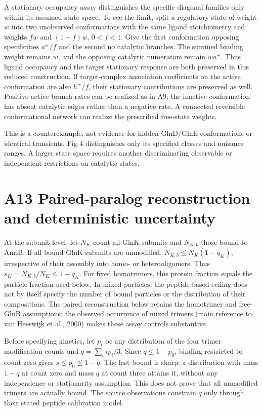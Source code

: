 \documentclass[11pt]{article}
\begin{document}
A stationary occupancy assay distinguishes the specific diagonal families only within its assumed state space. To see the limit, split a regulatory state of weight $w$ into two unobserved conformations with the same ligand stoichiometry and weights $fw$ and $(1-f)w$, $0<f<1$. Give the first conformation opposing specificities $a^{\pm}/f$ and the second no catalytic branches. The summed binding weight remains $w$, and the opposing catalytic numerators remain $wa^{\pm}$. Thus ligand occupancy and the target stationary response are both preserved in this reduced construction. If target-complex association coefficients on the active conformation are also $h^{\pm}/f$, their stationary contributions are preserved as well. Positive active-branch rates can be realized as in A9; the inactive conformation has absent catalytic edges rather than a negative rate. A connected reversible conformational network can realize the prescribed free-state weights.

This is a counterexample, not evidence for hidden GlnD/GlnE conformations or identical transients. Fig 4 distinguishes only its specified classes and nuisance ranges. A larger state space requires another discriminating observable or independent restrictions on catalytic states.


\section*{A13 Paired-paralog reconstruction and deterministic uncertainty}

At the subunit level, let $N_K$ count all GlnK subunits and $N_{K,b}$ those bound to AmtB. If all bound GlnK subunits are unmodified, $N_{K,b}\leq N_K(1-q_K)$, irrespective of their assembly into homo- or heterooligomers. Thus $s_K=N_{K,b}/N_K\leq1-q_K$. For fixed homotrimers, this protein fraction equals the particle fraction used below. In mixed particles, the peptide-based ceiling does not by itself specify the number of bound particles or the distribution of their compositions. The paired reconstruction below retains the homotrimer and free-GlnB assumptions; the observed occurrence of mixed trimers (main reference to van Heeswijk et al., 2000) makes these assay controls substantive.

Before specifying kinetics, let $p_i$ be any distribution of the four trimer modification counts and $q=\sum_i ip_i/3$. Since $q\leq1-p_0$, binding restricted to count zero gives $s\leq p_0\leq1-q$. The last bound is sharp: a distribution with mass $1-q$ at count zero and mass $q$ at count three attains it, without any independence or stationarity assumption. This does not prove that all unmodified trimers are actually bound. The source observations constrain $q$ only through their stated peptide calibration model.
\end{document}
